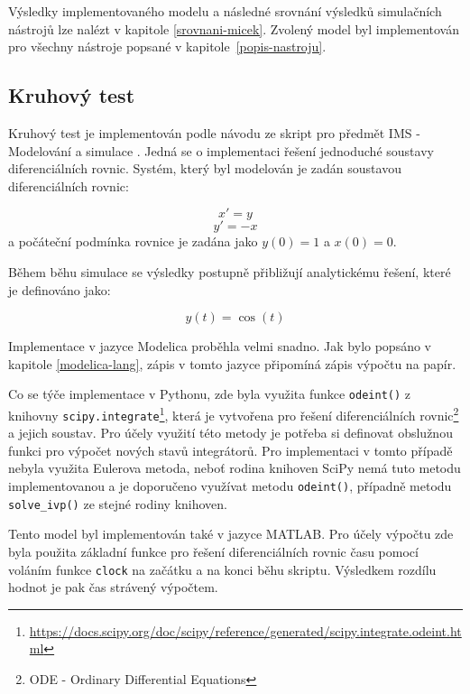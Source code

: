 Výsledky implementovaného modelu a následné srovnání výsledků simulačních nástrojů lze nalézt v kapitole \ref{srovnani-micek}.
Zvolený model byl implementován pro všechny nástroje popsané v kapitole~\ref{popis-nastroju}.

\subsection{Kruhový test}
\label{kruhovy-test}

Kruhový test je implementován podle návodu ze skript pro předmět IMS - Modelování a simulace \cite{IMS-skripta}. Jedná se o implementaci řešení jednoduché soustavy diferenciálních rovnic. Systém, který byl modelován je zadán soustavou diferenciálních rovnic:

\begin{equation}
   x' = y
\end{equation}
\begin{equation}
    y' = -x
\end{equation}
a počáteční podmínka rovnice je zadána jako $y(0) = 1$ a $x(0) = 0$.

Během běhu simulace se výsledky postupně přibližují analytickému řešení, které je definováno jako:

\begin{equation}
    y(t) = \cos(t)
\end{equation}


Implementace v jazyce Modelica proběhla velmi snadno. Jak bylo popsáno v kapitole \ref{modelica-lang}, zápis v tomto jazyce připomíná zápis výpočtu na papír. 

Co se týče implementace v Pythonu, zde byla využita funkce \texttt{odeint()} z knihovny \texttt{scipy.integrate}\footnote{\url{https://docs.scipy.org/doc/scipy/reference/generated/scipy.integrate.odeint.html}}, která je vytvořena pro řešení diferenciálních rovnic\footnote{ODE - Ordinary Differential Equations} a jejich soustav. Pro účely využití této metody je potřeba si definovat obslužnou funkci pro výpočet nových stavů integrátorů. Pro implementaci v tomto případě nebyla využita Eulerova metoda, neboť rodina knihoven SciPy nemá tuto metodu implementovanou a je doporučeno využívat metodu \texttt{odeint()}, případně metodu \texttt{solve\_ivp()} ze stejné rodiny knihoven.

Tento model byl implementován také v jazyce MATLAB. Pro účely výpočtu zde byla použita základní funkce pro řešení diferenciálních rovnic času pomocí voláním funkce \texttt{clock} na začátku a na konci běhu skriptu. Výsledkem rozdílu hodnot je pak čas strávený výpočtem. 


